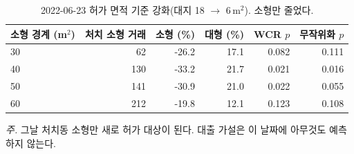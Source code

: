 \begin{table}[htbp]
  \centering
  \caption{2022-06-23 허가 면적 기준 강화(대지 18 $\to$ 6\,m$^2$). 소형만 줄었다.}
  \label{tab:area-2022}
  \begin{tabular}{lrrrrr}
    \toprule
    \textbf{소형 경계 (m$^2$)} & \textbf{처치 소형 거래} & \textbf{소형 (\%)} & \textbf{대형 (\%)} & \textbf{WCR $p$} & \textbf{무작위화 $p$} \\
    \midrule
    30 & 62 & -26.2 & 17.1 & 0.082 & 0.111 \\
    40 & 130 & -33.2 & 21.7 & 0.021 & 0.016 \\
    50 & 141 & -30.9 & 21.0 & 0.022 & 0.055 \\
    60 & 212 & -19.8 & 12.1 & 0.123 & 0.108 \\
    \bottomrule
  \end{tabular}

  \begin{minipage}{\linewidth}\footnotesize
  \textit{주.} 그날 처치동 소형만 새로 허가 대상이 된다. 대출 가설은 이 날짜에 아무것도 예측하지 않는다.
  \end{minipage}
\end{table}
